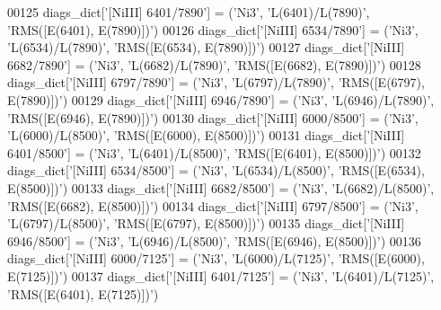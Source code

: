 \begin{DoxyCode}
00125 diags\_dict[\textcolor{stringliteral}{'[NiIII] 6401/7890'}] = (\textcolor{stringliteral}{'Ni3'}, \textcolor{stringliteral}{'L(6401)/L(7890)'}, \textcolor{stringliteral}{'RMS([E(6401), E(7890)])'})
00126 diags\_dict[\textcolor{stringliteral}{'[NiIII] 6534/7890'}] = (\textcolor{stringliteral}{'Ni3'}, \textcolor{stringliteral}{'L(6534)/L(7890)'}, \textcolor{stringliteral}{'RMS([E(6534), E(7890)])'})
00127 diags\_dict[\textcolor{stringliteral}{'[NiIII] 6682/7890'}] = (\textcolor{stringliteral}{'Ni3'}, \textcolor{stringliteral}{'L(6682)/L(7890)'}, \textcolor{stringliteral}{'RMS([E(6682), E(7890)])'})
00128 diags\_dict[\textcolor{stringliteral}{'[NiIII] 6797/7890'}] = (\textcolor{stringliteral}{'Ni3'}, \textcolor{stringliteral}{'L(6797)/L(7890)'}, \textcolor{stringliteral}{'RMS([E(6797), E(7890)])'})
00129 diags\_dict[\textcolor{stringliteral}{'[NiIII] 6946/7890'}] = (\textcolor{stringliteral}{'Ni3'}, \textcolor{stringliteral}{'L(6946)/L(7890)'}, \textcolor{stringliteral}{'RMS([E(6946), E(7890)])'})
00130 diags\_dict[\textcolor{stringliteral}{'[NiIII] 6000/8500'}] = (\textcolor{stringliteral}{'Ni3'}, \textcolor{stringliteral}{'L(6000)/L(8500)'}, \textcolor{stringliteral}{'RMS([E(6000), E(8500)])'})
00131 diags\_dict[\textcolor{stringliteral}{'[NiIII] 6401/8500'}] = (\textcolor{stringliteral}{'Ni3'}, \textcolor{stringliteral}{'L(6401)/L(8500)'}, \textcolor{stringliteral}{'RMS([E(6401), E(8500)])'})
00132 diags\_dict[\textcolor{stringliteral}{'[NiIII] 6534/8500'}] = (\textcolor{stringliteral}{'Ni3'}, \textcolor{stringliteral}{'L(6534)/L(8500)'}, \textcolor{stringliteral}{'RMS([E(6534), E(8500)])'})
00133 diags\_dict[\textcolor{stringliteral}{'[NiIII] 6682/8500'}] = (\textcolor{stringliteral}{'Ni3'}, \textcolor{stringliteral}{'L(6682)/L(8500)'}, \textcolor{stringliteral}{'RMS([E(6682), E(8500)])'})
00134 diags\_dict[\textcolor{stringliteral}{'[NiIII] 6797/8500'}] = (\textcolor{stringliteral}{'Ni3'}, \textcolor{stringliteral}{'L(6797)/L(8500)'}, \textcolor{stringliteral}{'RMS([E(6797), E(8500)])'})
00135 diags\_dict[\textcolor{stringliteral}{'[NiIII] 6946/8500'}] = (\textcolor{stringliteral}{'Ni3'}, \textcolor{stringliteral}{'L(6946)/L(8500)'}, \textcolor{stringliteral}{'RMS([E(6946), E(8500)])'})
00136 diags\_dict[\textcolor{stringliteral}{'[NiIII] 6000/7125'}] = (\textcolor{stringliteral}{'Ni3'}, \textcolor{stringliteral}{'L(6000)/L(7125)'}, \textcolor{stringliteral}{'RMS([E(6000), E(7125)])'})
00137 diags\_dict[\textcolor{stringliteral}{'[NiIII] 6401/7125'}] = (\textcolor{stringliteral}{'Ni3'}, \textcolor{stringliteral}{'L(6401)/L(7125)'}, \textcolor{stringliteral}{'RMS([E(6401), E(7125)])'})

\end{DoxyCode}
